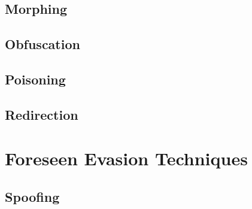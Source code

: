 \documentclass[11pt,fleqn,oneside]{book} %
\begin{document}
\chapter{Morphing} \label{ch:known-morphing}



\chapter{Obfuscation} \label{ch:known-obfuscation}


\newpage
\newpage
\chapter{Poisoning} \label{ch:known-poisoning}


\chapter{Redirection} \label{ch:known-redirection}


\newpage


\part{Foreseen Evasion Techniques}
\chapter{Spoofing} \label{ch:foreseen-spoofing}


\end{document}
